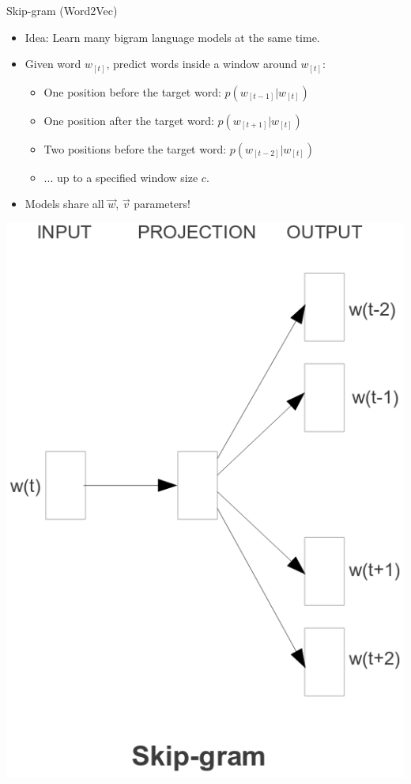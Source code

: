
\begin{vbframe}{Skip-gram (Word2Vec)}

\vfill

\begin{minipage}{.63\textwidth}
\begin{itemize}
	\item Idea: Learn many bigram language models at the same time.
	\item Given word $w_{[t]}$, predict words inside a window around $w_{[t]}$:
		\begin{itemize}
			 \item One position before the target word: $p(w_{[t-1]}|w_{[t]})$
			 \item One position after the target word: $p(w_{[t+1]}|w_{[t]})$
			 \item Two positions before the target word: $p(w_{[t-2]}|w_{[t]})$
			 \item ... up to a specified window size $c$.
		\end{itemize}
	\item Models share all $\vec w$, $\vec v$ parameters!
\end{itemize}
\end{minipage}
\begin{minipage}{.36\textwidth}
\begin{center}
\includegraphics[scale=0.99]{figure/skipgram}
\end{center}
\end{minipage}


\end{vbframe}
